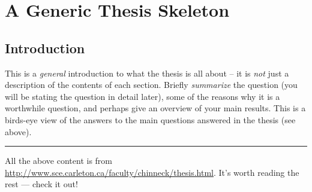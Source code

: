 %
%
%
%
%

\chapter{A Generic Thesis Skeleton} \label{chap:thesis-skeleton}


\section{Introduction}
This is a \emph{general} introduction to what the thesis is all about -- it is \emph{not} just a description of the contents of each section. Briefly \emph{summarize} the question (you will be stating the question in detail later), some of the reasons why it is a worthwhile question, and perhaps give an overview of your main results. This is a birds-eye view of the answers to the main questions answered in the thesis (see above).
\vspace{5mm}
\hrule
\vspace{5mm}

All the above content is from \url{http://www.sce.carleton.ca/faculty/chinneck/thesis.html}. It's worth reading the rest --- check it out!


